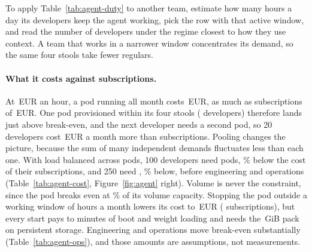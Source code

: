 To apply Table~\ref{tab:agent-duty} to another team, estimate how many hours a day its developers keep the agent
working, pick the row with that active window, and read the number of developers under the regime closest to how they
use context. A team that works in a narrower window concentrates its demand, so the same four stools take fewer
regulars.




\paragraph{What it costs against subscriptions.}
At \,EUR an hour, a pod running all month costs \,EUR, as much as
 subscriptions of \,EUR. One pod provisioned within its four stools
( developers) therefore lands just above break-even, and the next developer needs a
second pod, so 20 developers cost \,EUR a month more than subscriptions. Pooling
changes the picture, because the sum of many independent demands fluctuates less than each one. With load balanced
across pods, 100 developers need  pods, \%
below the cost of their subscriptions, and 250 need ,
\% below, before engineering and operations (Table~\ref{tab:agent-cost},
Figure~\ref{fig:agent} right). Volume is never the constraint, since the pod breaks even at
\% of its volume capacity. Stopping the pod outside a working window of
 hours a month lowers its cost to \,EUR
( subscriptions), but every start pays  to
 minutes of boot and weight loading and needs the \,GiB pack on
persistent storage. Engineering and operations move break-even substantially (Table~\ref{tab:agent-ops}), and those
amounts are assumptions, not measurements.




